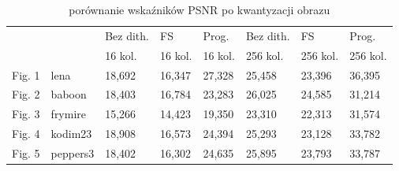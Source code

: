 \begin{table}[H]
    \caption{porównanie wskaźników PSNR po kwantyzacji obrazu}
    \centering
    \begin{tabular}{llllllll}
    \hline
           &           & Bez dith.  & FS      & Prog.   & Bez dith. & FS       & Prog.     \\
           &           & 16 kol.    & 16 kol. & 16 kol. & 256 kol.  & 256 kol. & 256 kol.  \\ \hline
    Fig. 1 & lena      & 18,692     & 16,347  & 27,328  & 25,458    & 23,396   & 36,395    \\ 
    Fig. 2 & baboon    & 18,403     & 16,784  & 23,283  & 26,025    & 24,585   & 31,214    \\ 
    Fig. 3 & frymire   & 15,266     & 14,423  & 19,350  & 23,310    & 22,313   & 31,574    \\ 
    Fig. 4 & kodim23   & 18,908     & 16,573  & 24,394  & 25,293    & 23,128   & 33,782    \\ 
    Fig. 5 & peppers3  & 18,402     & 16,302  & 24,635  & 25,895    & 23,793   & 33,787    \\ \hline
    \end{tabular}
\end{table}




